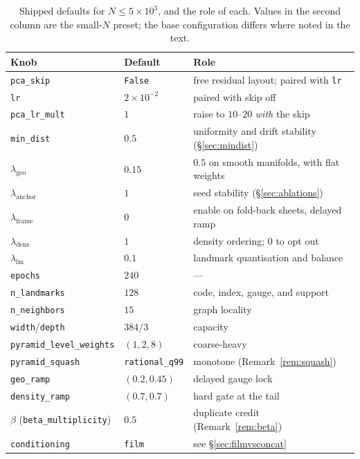 \documentclass[12pt]{iopart}
\theoremstyle{definition}
\theoremstyle{plain}
\theoremstyle{remark}
\newcommand{\code}[1]{\texttt{#1}}
\begin{document}
\begin{table}[htbp]
\centering
\small
\caption{Shipped defaults for $N\le5\times10^3$, and the role of each. Values
in the second column are the small-$N$ preset; the base configuration differs
where noted in the text.}
\label{tab:defaults}
\begin{tabular}{lll}
\toprule
Knob & Default & Role \\
\midrule
\code{pca\_skip} & \code{False} & free residual layout; paired with \code{lr} \\
\code{lr} & $2\times10^{-2}$ & paired with skip off \\
\code{pca\_lr\_mult} & $1$ & raise to $10$--$20$ \emph{with} the skip \\
\code{min\_dist} & $0.5$ & uniformity and drift stability (\S\ref{sec:mindist}) \\
$\lambda_{\mathrm{geo}}$ & $0.15$ & $0.5$ on smooth manifolds, with flat weights \\
$\lambda_{\mathrm{anchor}}$ & $1$ & seed stability (\S\ref{sec:ablations}) \\
$\lambda_{\mathrm{frame}}$ & $0$ & enable on fold-back sheets, delayed ramp \\
$\lambda_{\mathrm{dens}}$ & $1$ & density ordering; $0$ to opt out \\
$\lambda_{\mathrm{lm}}$ & $0.1$ & landmark quantisation and balance \\
\code{epochs} & $240$ & --- \\
\code{n\_landmarks} & $128$ & code, index, gauge, and support \\
\code{n\_neighbors} & $15$ & graph locality \\
\code{width}/\code{depth} & $384/3$ & capacity \\
\code{pyramid\_level\_weights} & $(1,2,8)$ & coarse-heavy \\
\code{pyramid\_squash} & \code{rational\_q99} & monotone (Remark~\ref{rem:squash}) \\
\code{geo\_ramp} & $(0.2,0.45)$ & delayed gauge lock \\
\code{density\_ramp} & $(0.7,0.7)$ & hard gate at the tail \\
$\beta$ (\code{beta\_multiplicity}) & $0.5$ & duplicate credit (Remark~\ref{rem:beta}) \\
\code{conditioning} & \code{film} & see \S\ref{sec:filmvsconcat} \\
\bottomrule
\end{tabular}
\end{table}
\end{document}
